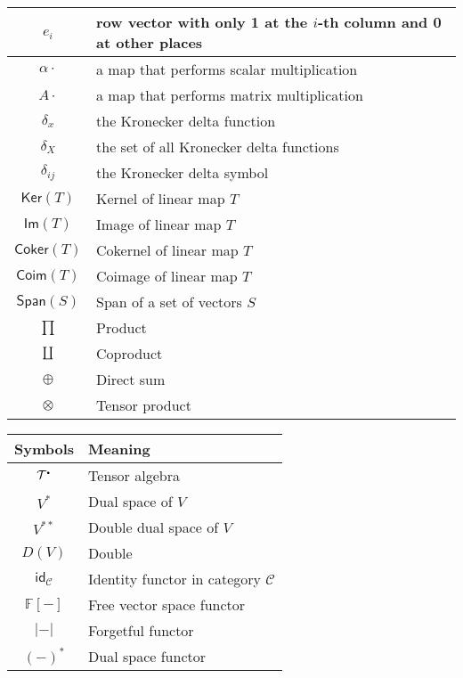 \documentclass[
	11pt, %
	fleqn, %
	a4paper, %
]{LegrandOrangeBook}
\newcommand{\smallbullet}{\scalebox{0.5}{$\bullet$}}
\renewcommand{\ker}[1]{\mathsf{Ker}(#1)} %
\renewcommand{\Im}[1]{\mathsf{Im}(#1)} %
\renewcommand{\span}[1]{\mathsf{Span}(#1)} %
\newcommand{\F}{\mathbb{F}} %
\newcommand{\coker}[1]{\mathsf{Coker}(#1)} %
\newcommand{\coim}[1]{\mathsf{Coim}(#1)} %
\newcommand{\id}{\mathsf{id}} %
\newcommand{\C}{\mathcal{C}} %
\newcommand{\T}{\mathcal{T}^{\smallbullet}} %
\DeclareRobustCommand{\coprod}{\mathop{\text{\fakecoprod}}}
\newcommand{\fakecoprod}{%
    \sbox0{$\prod$}%
    \smash{\raisebox{\dimexpr.9625\depth-\dp0}{\scalebox{1}[-1]{$\prod$}}}%
    \vphantom{$\prod$}%
}
\begin{document}
\begin{tabularx}{\textwidth}{cX}
    $\hat{e_i}$ & row vector with only 1 at the $i$-th column and 0 at other places \\
    \midrule
    $\alpha \cdot$ & a map that performs scalar multiplication \\
    $A \cdot$ & a map that performs matrix multiplication \\
    \midrule
    $\delta_x$ & the Kronecker delta function \\
    $\delta_X$ & the set of all Kronecker delta functions \\
    $\delta_{ij}$ & the Kronecker delta symbol \\
    \midrule
    $\ker{T}$ & Kernel of linear map $T$ \\
    $\Im{T}$ & Image of linear map $T$ \\
    $\coker{T}$ & Cokernel of linear map $T$ \\
    $\coim{T}$ & Coimage of linear map $T$ \\
    $\span{S}$ & Span of a set of vectors $S$ \\
    \midrule
    $\prod$ & Product \\
    $\coprod$ & Coproduct \\
    $\oplus$ & Direct sum \\
    $\otimes$ & Tensor product \\
    \bottomrule
\end{tabularx}

\noindent \begin{tabularx}{\textwidth}{cX}
    \toprule
    \textbf{Symbols} & \textbf{Meaning} \\
    \midrule
    $\T$ & Tensor algebra \\
    \midrule
    $V^*$ & Dual space of $V$ \\
    $V^{**}$ & Double dual space of $V$ \\
    $D(V)$ & Double \\
    \midrule
    $\id_{\C}$ & Identity functor in category $\C$ \\
    $\F[-]$ & Free vector space functor \\
    $|-|$ & Forgetful functor \\
    $(-)^*$ & Dual space functor \\
    \bottomrule
\end{tabularx}


\end{document}
